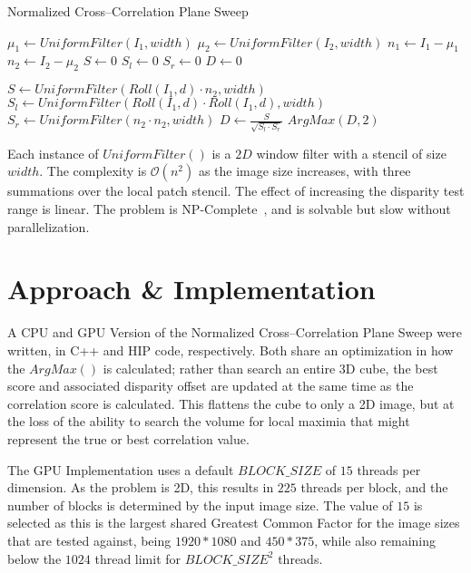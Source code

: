 \documentclass[runningheads]{llncs}
\begin{document}
\begin{algorithm}
\caption{Normalized Cross--Correlation Plane Sweep}\label{alg:cap}
\begin{algorithmic}
\State $\mu_{1} \gets UniformFilter(I_{1}, width)$
\State $\mu_{2} \gets UniformFilter(I_{2}, width)$
\State $n_{1} \gets I_{1} - \mu_{1}$
\State $n_{2} \gets I_{2} - \mu_{2}$
\State $S \gets 0$
\State $S_{l} \gets 0$
\State $S_{r} \gets 0$
\State $D \gets 0$

\State $S \gets UniformFilter(Roll(I_{1},d) \cdot n_{2}, width)$
\State $S_{l} \gets UniformFilter(Roll(I_{1},d) \cdot Roll(I_{1},d), width)$
\State $S_{r} \gets UniformFilter(n_{2} \cdot n_{2}, width)$
\State $D \gets \frac{S}{\sqrt{S_{l} \cdot S_{r} }}$
\EndFor
\State \Return $ArgMax(D, 2)$  
\end{algorithmic}
\end{algorithm}

Each instance of $UniformFilter()$ is a $2D$ window filter with a stencil of size $width$. The complexity is $\mathcal{O}(n^2)$ as the image size increases, with three summations over the local patch stencil. The effect of increasing the disparity test range is linear. The problem is NP-Complete~\cite{wikipedia2022stereovision}, and is solvable but slow without parallelization.




\section{Approach \& Implementation}

A CPU and GPU Version of the Normalized Cross--Correlation Plane Sweep were written, in C++ and HIP code, respectively. Both share an optimization in how the $ArgMax()$ is calculated; rather than search an entire 3D cube, the best score and associated disparity offset are updated at the same time as the correlation score is calculated. This flattens the cube to only a 2D image, but at the loss of the ability to search the volume for local maximia that might represent the true or best correlation value.

The GPU Implementation uses a default $BLOCK\_SIZE$ of $15$ threads per dimension. As the problem is 2D, this results in $225$ threads per block, and the number of blocks is determined by the input image size. The value of $15$ is selected as this is the largest shared Greatest Common Factor for the image sizes that are tested against, being $1920*1080$ and $450*375$, while also remaining below the $1024$ thread limit for $BLOCK\_SIZE^2$ threads.
\end{document}

